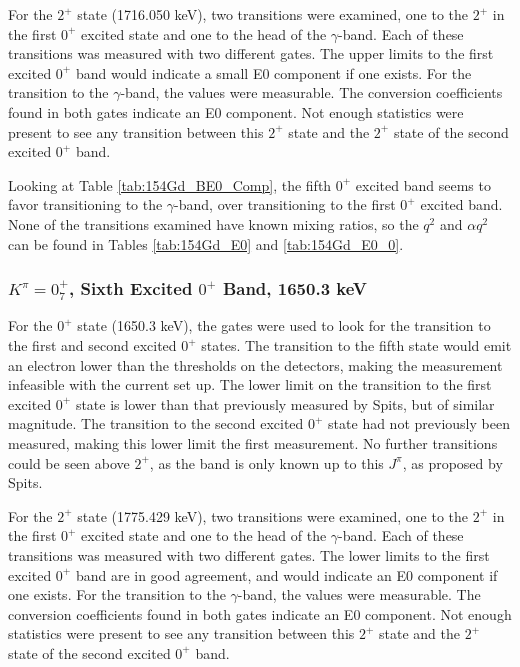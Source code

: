 For the $2^+$ state (1716.050 keV), two transitions were examined, one to the $2^+$ in the first $0^+$ excited state and one to the head of the $\gamma$-band. Each of these transitions was measured with two different gates. The upper limits to the first excited $0^+$ band would indicate a small E0 component if one exists. For the transition to the $\gamma$-band, the values were measurable. The conversion coefficients found in both gates indicate an E0 component. Not enough statistics were present to see any transition between this $2^+$ state and the $2^+$ state of the second excited $0^+$ band.

Looking at Table \ref{tab:154Gd_BE0_Comp}, the fifth $0^+$ excited band seems to favor transitioning to the $\gamma$-band, over transitioning to the first $0^+$ excited band. None of the transitions examined have known mixing ratios, so the $q^2$ and $\alpha q^2$ can be found in Tables \ref{tab:154Gd_E0} and \ref{tab:154Gd_E0_0}. 

\subsubsection{$K^{\pi}=0^+_7$, Sixth Excited $0^+$ Band, 1650.3 keV}

For the $0^+$ state (1650.3 keV), the gates were used to look for the transition to the first and second excited $0^+$ states. The transition to the fifth state would emit an electron lower than the thresholds on the detectors, making the measurement infeasible with the current set up. The lower limit on the transition to the first excited $0^+$ state is lower than that previously measured by Spits, but of similar magnitude. The transition to the second excited $0^+$ state had not previously been measured, making this lower limit the first measurement. No further transitions could be seen above $2^+$, as the band is only known up to this $J^{\pi}$, as proposed by Spits\citep{spits96:_154gd}.

For the $2^+$ state (1775.429 keV), two transitions were examined, one to the $2^+$ in the first $0^+$ excited state and one to the head of the $\gamma$-band. Each of these transitions was measured with two different gates. The lower limits to the first excited $0^+$ band are in good agreement, and would indicate an E0 component if one exists. For the transition to the $\gamma$-band, the values were measurable. The conversion coefficients found in both gates indicate an E0 component. Not enough statistics were present to see any transition between this $2^+$ state and the $2^+$ state of the second excited $0^+$ band.


